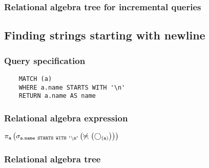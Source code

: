 	\subsubsection*{Relational algebra tree for incremental queries}

	\subsection{Finding strings starting with newline}

	\subsubsection*{Query specification}

	\begin{lstlisting}
	MATCH (a)
	WHERE a.name STARTS WITH '\n'
	RETURN a.name AS name
	\end{lstlisting}


	\subsubsection*{Relational algebra expression}

	$\projection{\var{a}} \left(\selection{\mathtt{a.name~STARTS~WITH~'\backslash{}n'}} \left(\alldifferent{} \left(\getvertices{a}{}\right)\right)\right)$

	\subsubsection*{Relational algebra tree}


